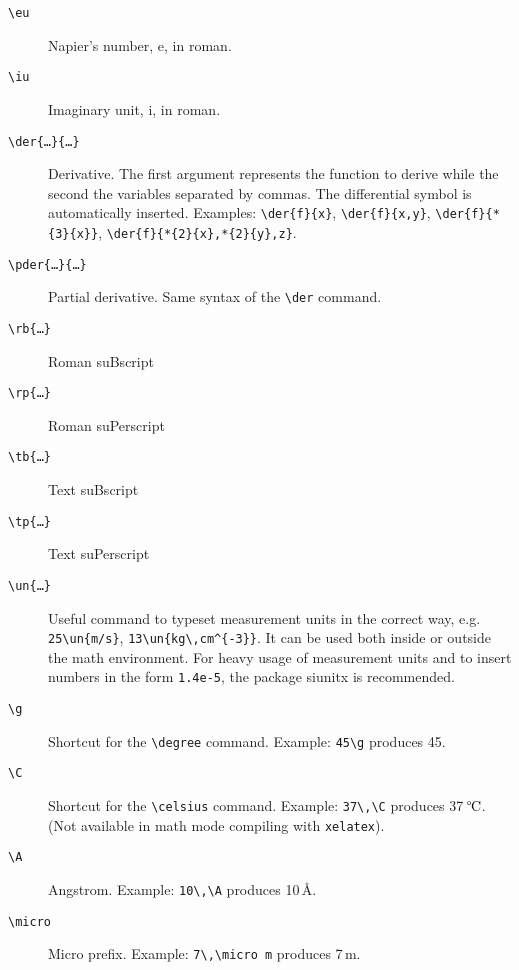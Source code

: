 \documentclass[a5paper,11pt]{article}
\newcommand{\bs}{\textbackslash}
\providecommand{\degree}{\mbox{\textdegree}}
\providecommand{\g}{\degree}
\providecommand{\celsius}{\ensuremath{\textrm{\upshape\textdegree}\kern-\scriptspace\mathrm{C}}}
\providecommand{\C}{\celsius}
\providecommand{\angstrom}{\mbox{\AA}}
\providecommand{\A}{\angstrom}
\providecommand{\micro}{\mbox{\textmu}}
\begin{document}
\begin{description}
\item[\texttt{\bs eu}] Napier's number, $\mathrm{e}$,  in roman.

\item[\texttt{\bs iu}] Imaginary unit, $\mathrm{i}$,  in roman.

\item[\texttt{\bs der\{\dots\}\{\dots\}}] Derivative. The first argument represents the function to derive while the second the variables separated by commas. The differential symbol is automatically inserted. Examples:
\texttt{\bs der\{f\}\{x\}}, \texttt{\bs der\{f\}\{x,y\}}, \texttt{\bs der\{f\}\{*\{3\}\{x\}\}}, 
\texttt{\bs der\{f\}\{*\{2\}\{x\},*\{2\}\{y\},z\}}.

\item[\texttt{\bs pder\{\dots\}\{\dots\}}] Partial derivative. Same syntax of the \texttt{\bs der} command.

\item[\texttt{\bs rb\{\dots\}}] Roman suBscript

\item[\texttt{\bs rp\{\dots\}}] Roman suPerscript

\item[\texttt{\bs tb\{\dots\}}] Text suBscript

\item[\texttt{\bs tp\{\dots\}}] Text suPerscript

\item[\texttt{\bs un\{\dots\}}] Useful command to typeset measurement units in the correct way, e.g. \texttt{25\bs un\{m/s\}},
\texttt{13\bs un\{kg\bs ,cm\^{}\{-3\}\}}. It can be used both inside or outside the math environment.
For heavy usage of measurement units and to insert numbers in the form
\texttt{1.4e-5}, the package \textsf{siunitx} is recommended.

\item[\texttt{\bs g}] Shortcut for the \texttt{\bs degree} command. Example: \texttt{45\bs g} produces 45\g.

\item[\texttt{\bs C}] Shortcut for the \texttt{\bs celsius} command. Example: \texttt{37\bs ,\bs C} produces 37\,\C. (Not available in math mode compiling with \texttt{xelatex}).

\item[\texttt{\bs A}] Angstrom. Example: \texttt{10\bs ,\bs A} produces 10\,\A.

\item[\texttt{\bs micro}] Micro prefix. Example: \texttt{7\bs ,\bs micro m} produces 7\,\micro m.


\end{description}
\end{document}
